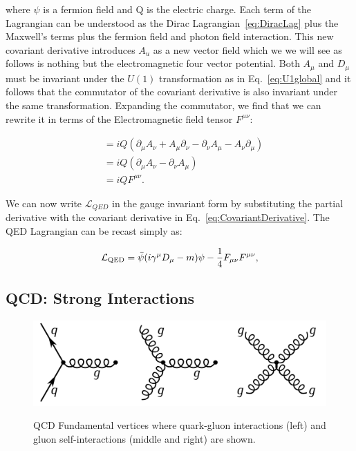 where $\psi$ is a fermion field and Q is the electric charge. Each term of the Lagrangian can be understood as the Dirac Lagrangian~\ref{eq:DiracLag} plus the Maxwell's terms plus the fermion field and photon field interaction. This new covariant derivative introduces $A_{u}$ as a new vector field which we we will see as follows is nothing but the electromagnetic four vector potential. Both $A_\mu$ and $D_\mu$ must be invariant under the $U(1)$ transformation as in Eq.~\ref{eq:U1global} and it follows that the commutator of the covariant derivative is also invariant under the same transformation. Expanding the commutator, we find that we can rewrite it in terms of the Electromagnetic field tensor $F^{\mu\nu}$:


\begin{align*}
    [D_\mu, D_\nu] &= iQ(\partial_\mu A_\nu + A_\mu \partial_\nu - \partial_\nu A_\mu - A_\nu \partial_\mu) \\
    &= iQ(\partial_\mu A_\nu - \partial_\nu A_\mu) \\ 
    &= iQ F^{\mu\nu}.
\end{align*}


We can now write $\mathcal{L}_{QED}$ in the gauge invariant form by substituting the partial derivative with the covariant derivative in Eq.~\ref{eq:CovariantDerivative}.  The QED Lagrangian can be recast simply as:

\begin{equation}
\label{eq:QEDLagrangian}
\mathcal{L}_{\textnormal{QED}} = \bar{\psi} (i \gamma^{\mu} D_{\mu} - m) \psi - \frac{1}{4} F_{\mu\nu} F^{\mu\nu},
\end{equation}

\subsection{QCD: Strong Interactions}

\begin{figure}[!htbp]
	\centering
 	\caption{QCD Fundamental vertices where quark-gluon interactions (left) and gluon self-interactions (middle and right) are shown.}
    \includegraphics[scale=0.4]{fig/QCDFundamentalVertices.png}
	\label{fig:QCDFundamentalVertices}
\end{figure}


